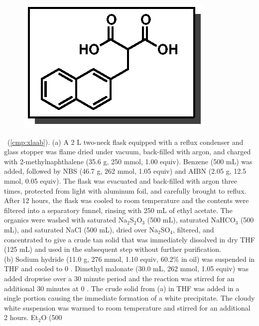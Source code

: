 \vspace{10pt}
\begin{figure}
  \vspace{-22pt}
  \begin{center}
    \includegraphics[scale=0.8]{chp_asymmetric/images/xlaab}
  \end{center}
  \vspace{-30pt}
\end{figure}
\noindent \textbf{\CMPxlaab}\ (\ref{cmp:xlaab}). (a) A 2 L two-neck
flask equipped with a reflux condenser and glass stopper was flame dried under
vacuum, back-filled with argon, and charged with 2-methylnaphthalene (35.6 g,
250 mmol, 1.00 equiv). Benzene (500 mL) was added, followed by NBS (46.7 g, 262
mmol, 1.05 equiv) and AIBN (2.05 g, 12.5 mmol, 0.05 equiv). The flask was
evacuated and back-filled with argon three times, protected from light with
aluminum foil, and carefully brought to reflux. After 12 hours, the flask was cooled to room
temperature and the contents were filtered into a separatory funnel, rinsing
with 250 mL of ethyl acetate. The organics were washed with saturated
Na$_2$S$_2$O$_3$ (500 mL), saturated NaHCO$_3$ (500 mL), and saturated NaCl (500
mL), dried over Na$_2$SO$_4$, filtered, and concentrated to give a crude tan solid that
was immediately dissolved in dry THF (125 mL) and used in the subsequent step
without further purification. \\ 
(b) Sodium hydride (11.0 g, 276 mmol, 1.10 equiv, 60.2\% in oil) was suspended
in THF and cooled to 0 \degc. Dimethyl malonate (30.0 mL, 262 mmol, 1.05 equiv)
was added dropwise over a 30 minute period and the reaction was stirred for an additional
30 minutes at 0 \degc. The crude solid from (a) in THF was added in a single
portion causing the immediate formation of a white precipitate. The cloudy white
suspension was warmed to room temperature and stirred for an additional 2 hours. Et$_2$O (500
